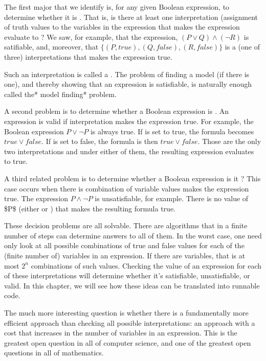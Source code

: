 \documentclass[letterpaper,10pt,english]{sphinxmanual}
\begin{document}
The first major  that we identify is, for any given
Boolean expression, to determine whether it is . That is,
is there at least one interpretation (assignment of truth values to
the variables in the expression that makes the expression evaluate to
?  We saw, for example, that the expression, \((P \lor Q)
\land (\lnot R)\) is satifiable, and, moreover, that \(\{ (P,
true), (Q, false), (R, false) \}\) is a (one of three) interpretations
that makes the expression true.

Such an interpretation is called a . The problem of finding a
model (if there is one), and thereby showing that an expression is
satisfiable, is naturally enough called the* model finding* problem.

A second problem is to determine whether a Boolean expression is
. An expression is valid if  interpretation makes the
expression true. For example, the Boolean expression \(P \lor
\neg P\) is always true. If  is set to true, the formula becomes
\(true \lor false\). If  is set to false, the formula is then
\(true \lor false\). Those are the only two interpretations and
under either of them, the resulting expression evaluates to true.

A third related problem is to determine whether a Boolean expression
is it ? This case occurs when there is  combination
of variable values makes the expression true. The expression \(P
\land \neg P\) is unsatisfiable, for example. There is no value of \$P\$
(either  or ) that makes the resulting formula true.

These decision problems are all solvable. There are algorithms that in
a finite number of steps can determine answers to all of them. In the
worst case, one need only look at all possible combinations of true
and false values for each of the (finite number of) variables in an
expression. If there are  variables, that is at most \(2^n\)
combinations of such values. Checking the value of an expression for
each of these interpretations will determine whether it’s satisfiable,
unsatisfiable, or valid. In this chapter, we will see how these ideas
can be translated into runnable code.

The much more interesting question is whether there is a fundamentally
more efficient approach than checking all possible interpretations: an
approach with a cost that increases  in the number of
variables in an expression. This is the greatest open question in all
of computer science, and one of the greatest open questions in all of
mathematics.
\end{document}
